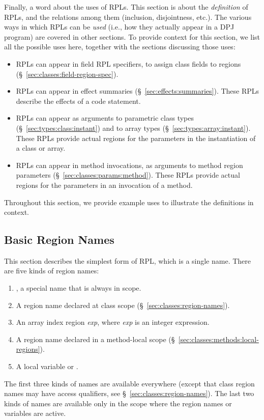 Finally, a word about the uses of RPLs.  This section is about the
\emph{definition} of RPLs, and the relations among them (inclusion,
disjointness, etc.).  The various ways in which RPLs can be
\emph{used} (i.e., how they actually appear in a DPJ program) are
covered in other sections.  To provide context for this section, we
list all the possible uses here, together with the sections discussing
those uses:
%
\begin{itemize}
%
\item RPLs can appear in field RPL specifiers, to assign class fields
  to regions (\S~\ref{sec:classes:field-region-spec}).
%
\item RPLs can appear in effect summaries
  (\S~\ref{sec:effects:summaries}).  These RPLs describe the effects
  of a code statement.
%
\item RPLs can appear as arguments to parametric class types
  (\S~\ref{sec:types:class:instant}) and to array types
  (\S~\ref{sec:types:array:instant}).  These RPLs provide actual
  regions for the parameters in the instantiation of a class or array.
%
\item RPLs can appear in method invocations, as arguments to method
  region parameters (\S~\ref{sec:classes:params:method}).  These RPLs
  provide actual regions for the parameters in an invocation of a
  method.
%
\end{itemize}
%
Throughout this section, we provide example uses to illustrate the
definitions in context.

\subsection{Basic Region Names%
\label{sec:rpls:basic}}

This section describes the simplest form of RPL, which is a single
name.  There are five kinds of region names: 
%
\begin{enumerate}
%
\item
{}, a special name that is always in scope.
%
\item A region name declared at class scope
  (\S~\ref{sec:classes:region-names}).
%
\item An array index region \kwd{[}\emph{exp}\kwd{]}, where \emph{exp}
  is an integer expression.
%
\item A region name declared in a method-local scope
  (\S~\ref{sec:classes:methods:local-regions}).
%
\item A  local variable or .  
%
\end{enumerate}
%
The first three kinds of names are available everywhere (except that
class region names may have access qualifiers, see
\S~\ref{sec:classes:region-names}).  The last two kinds of names are
available only in the scope where the region names or variables
are active.


